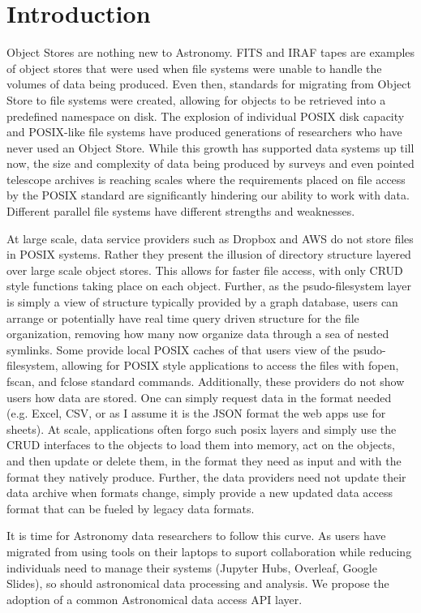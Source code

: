 \section{Introduction} \label{sec:intro}

Object Stores are nothing new to Astronomy.  FITS and IRAF tapes are examples
of object stores that were used when file systems were unable to handle the volumes
of data being produced. Even then, standards for migrating from Object Store to file
systems were created, allowing for objects to be retrieved into a predefined namespace
on disk.  The explosion of individual POSIX disk capacity and POSIX-like file systems
have produced generations of researchers who have never used an Object Store. While
this growth has supported data systems up till now, the size and complexity of
data being produced by surveys and even pointed telescope archives is reaching
scales where the requirements placed on file access by the POSIX standard are
significantly hindering our ability to work with data.  Different parallel file systems
have different strengths and weaknesses.

At large scale, data service providers such as Dropbox and AWS do not store files
in POSIX systems.  Rather they present the illusion of directory structure layered over
large scale object stores. This allows for faster file access, with only CRUD style
functions taking place on each object.  Further, as the psudo-filesystem layer is simply a
view of structure typically provided by a graph database, users can arrange or potentially
have real time query driven structure for the file organization, removing how many now
organize data through a sea of nested symlinks.
Some provide local POSIX caches of that users view of the
psudo-filesystem, allowing for POSIX style applications to access the files with
fopen, fscan, and fclose standard commands. Additionally, these providers do
not show users how data are stored. One can simply request data in the format
needed (e.g. Excel, CSV, or as I assume it is the JSON format the web apps
use for sheets).   At scale, applications often forgo
such posix layers and simply use the CRUD interfaces to the objects to load them into
memory, act on the objects, and then update or delete them, in the format they need
as input and with the format they natively produce. Further, the data providers need
not update their data archive when formats change, simply provide a new updated
data access format that can be fueled by legacy data formats.

It is time for Astronomy data researchers to follow this curve. As users have migrated
from using tools on their laptops to suport collaboration while reducing
individuals need to manage their systems (Jupyter Hubs, Overleaf, Google Slides),
so should astronomical data processing and analysis. We propose the adoption of
a common Astronomical data access API layer.



